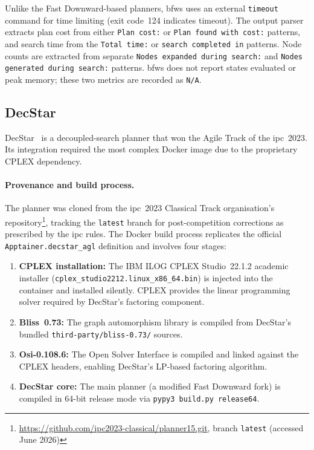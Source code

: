 Unlike the Fast Downward-based planners, \gls{bfws} uses an external \texttt{timeout} command for time limiting (exit code~124 indicates timeout).
The output parser extracts plan cost from either \texttt{Plan cost:} or \texttt{Plan found with cost:} patterns, and search time from the \texttt{Total time:} or \texttt{search completed in} patterns.
Node counts are extracted from separate \texttt{Nodes expanded during search:} and \texttt{Nodes generated during search:} patterns.
\gls{bfws} does not report states evaluated or peak memory; these two metrics are recorded as \texttt{N/A}.


\subsection{DecStar}
\label{sec:impl:decstar}

DecStar~\cite{GnadHoffmann2018} is a decoupled-search planner that won the Agile Track of the \gls{ipc}~2023.
Its integration required the most complex Docker image due to the proprietary CPLEX dependency.

\paragraph{Provenance and build process.}
The planner was cloned from the \gls{ipc}~2023 Classical Track organisation's repository\footnote{\url{https://github.com/ipc2023-classical/planner15.git}, branch \texttt{latest} (accessed June 2026)}, tracking the \texttt{latest} branch for post-competition corrections as prescribed by the \gls{ipc} rules.
The Docker build process replicates the official \texttt{Apptainer.decstar\_agl} definition and involves four stages:

\begin{enumerate}
  \item \textbf{CPLEX installation:} The IBM ILOG CPLEX Studio~22.1.2 academic installer (\nolinkurl{cplex_studio2212.linux_x86_64.bin}) is injected into the container and installed silently. CPLEX provides the linear programming solver required by DecStar's factoring component.
  \item \textbf{Bliss~0.73:} The graph automorphism library is compiled from DecStar's bundled \texttt{third-party/bliss-0.73/} sources.
  \item \textbf{Osi-0.108.6:} The Open Solver Interface is compiled and linked against the CPLEX headers, enabling DecStar's LP-based factoring algorithm.
  \item \textbf{DecStar core:} The main planner (a modified Fast Downward fork) is compiled in 64-bit release mode via \texttt{pypy3 build.py release64}.
\end{enumerate}

